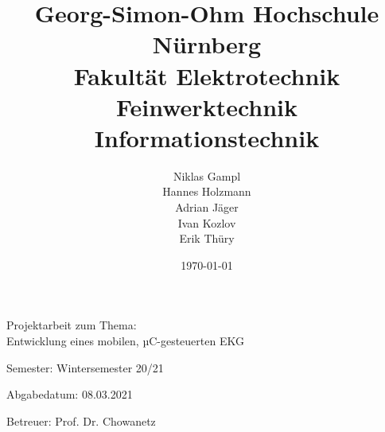 
\title{Georg-Simon-Ohm Hochschule Nürnberg\\Fakultät Elektrotechnik Feinwerktechnik Informationstechnik}
\author{Niklas Gampl\\Hannes Holzmann\\Adrian Jäger\\Ivan Kozlov\\Erik Thüry}
\date{\today}
\maketitle

\noindent
\begin{center}
    \Large{Projektarbeit zum Thema:\\
    Entwicklung eines mobilen, µC-gesteuerten EKG}
\end{center}
\normalsize

\vfill

\noindent
Semester: Wintersemester 20/21

\noindent
Abgabedatum: 08.03.2021

\noindent
Betreuer: Prof. Dr. Chowanetz
